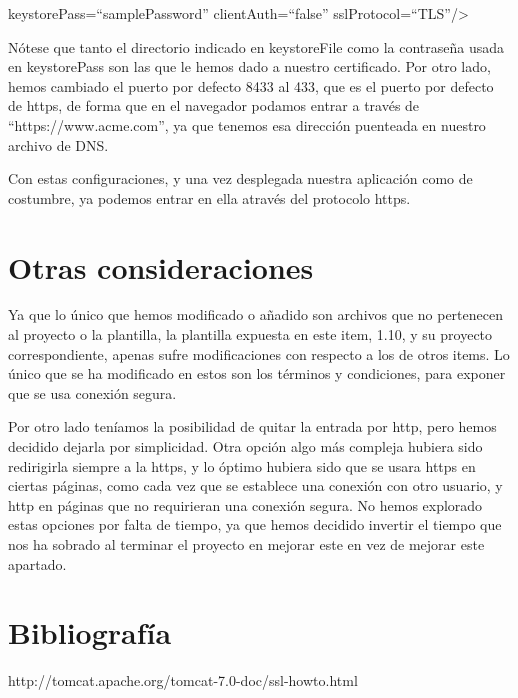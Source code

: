 \documentclass[a4paper]{article}
\begin{document}
\noindent\colorbox{shadecolor}{keystorePass=``samplePassword'' clientAuth=``false'' sslProtocol=``TLS''/\textgreater }

Nótese que tanto el directorio indicado en keystoreFile como la contraseña usada en keystorePass son las que le hemos dado a nuestro certificado. Por otro lado, hemos cambiado el puerto por defecto 8433 al 433, que es el puerto por defecto de https, de forma que en el navegador podamos entrar a través de ``https://www.acme.com'', ya que tenemos esa dirección puenteada en nuestro archivo de DNS.

Con estas configuraciones, y una vez desplegada nuestra aplicación como de costumbre, ya podemos entrar en ella através del protocolo https.

\section{Otras consideraciones}
Ya que lo único que hemos modificado o añadido son archivos que no pertenecen al proyecto o la plantilla, la plantilla expuesta en este item, 1.10, y su proyecto correspondiente, apenas sufre modificaciones con respecto a los de otros items. Lo único que se ha modificado en estos son los términos y condiciones, para exponer que se usa conexión segura.

Por otro lado teníamos la posibilidad de quitar la entrada por http, pero hemos decidido dejarla por simplicidad. Otra opción algo más compleja hubiera sido redirigirla siempre a la https, y lo óptimo hubiera sido que se usara https en ciertas páginas, como cada vez que se establece una conexión con otro usuario, y http en páginas que no requirieran una conexión segura. No hemos explorado estas opciones por falta de tiempo, ya que hemos decidido invertir el tiempo que nos ha sobrado al terminar el proyecto en mejorar este en vez de mejorar este apartado.

\section{Bibliografía}
http://tomcat.apache.org/tomcat-7.0-doc/ssl-howto.html
\end{document}
